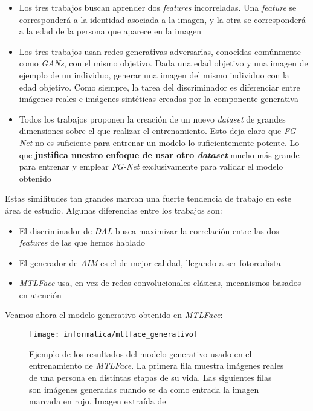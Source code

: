 \begin{itemize}
    \item Los tres trabajos buscan aprender dos \textit{features} incorreladas. Una \textit{feature} se corresponderá a la identidad asociada a la imagen, y la otra se corresponderá a la edad de la persona que aparece en la imagen
    \item Los tres trabajos usan redes generativas adversarias, conocidas comúnmente como \textit{GANs}, con el mismo objetivo. Dada una edad objetivo y una imagen de ejemplo de un individuo, generar una imagen del mismo individuo con la edad objetivo. Como siempre, la tarea del discriminador es diferenciar entre imágenes reales e imágenes sintéticas creadas por la componente generativa
    \item Todos los trabajos proponen la creación de un nuevo \textit{dataset} de grandes dimensiones sobre el que realizar el entrenamiento. Esto deja claro que \textit{FG-Net} no es suficiente para entrenar un modelo lo suficientemente potente. Lo que \textbf{justifica nuestro enfoque de usar otro \textit{dataset}} mucho más grande para entrenar y emplear \textit{FG-Net} exclusivamente para validar el modelo obtenido
\end{itemize}

Estas similitudes tan grandes marcan una fuerte tendencia de trabajo en este área de estudio. Algunas diferencias entre los trabajos son:

\begin{itemize}
    \item El discriminador de \textit{DAL} busca maximizar la correlación entre las dos \textit{features} de las que hemos hablado
    \item El generador de \textit{AIM} es el de mejor calidad, llegando a ser fotorealista
    \item \textit{MTLFace} usa, en vez de redes convolucionales clásicas, mecanismos basados en atención
\end{itemize}

Veamos ahora el modelo generativo obtenido en \textit{MTLFace}:

\begin{figure}[H]
    \centering
    \texttt{[image: informatica/mtlface\_generativo]}
    \caption{Ejemplo de los resultados del modelo generativo usado en el entrenamiento de \textit{MTLFace}. La primera fila muestra imágenes reales de una persona en distintas etapas de su vida. Las siguientes filas son imágenes generadas cuando se da como entrada la imagen marcada en rojo. Imagen extraída de \cite{informatica:best_fgnet_model}}
\end{figure}

